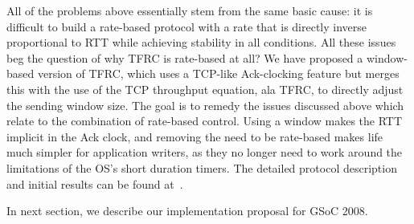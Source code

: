 \vspace{-0.2in} 
All of the problems above essentially stem from the same basic cause: it is
difficult to build a rate-based protocol with a rate that is directly inverse
proportional to RTT while achieving stability in all conditions. All these
issues beg the question of why TFRC is rate-based at all?  We have proposed a
window-based version of TFRC, which uses a TCP-like Ack-clocking feature but
merges this with the use of the TCP throughput equation, ala TFRC, to directly
adjust the sending window size. The goal is to remedy the issues discussed above
which relate to the combination of rate-based control. Using a window makes the
RTT implicit in the Ack clock, and removing the need to be rate-based makes life
much simpler for application writers, as they no longer need to work around the
limitations of the OS's short duration timers. The detailed protocol description
and initial results can be found at~\cite{SH06}.

In next section, we describe our implementation proposal for GSoC 2008.
